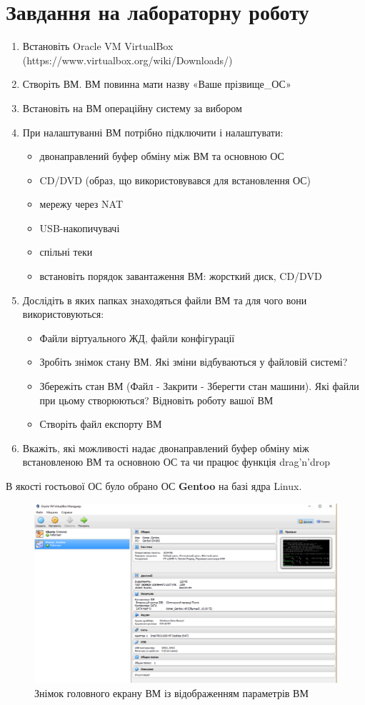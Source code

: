 \documentclass[12pt,a4paper]{article}
\begin{document}
\section{Завдання на лабораторну роботу}
\begin{enumerate}
	\item Встановіть Oracle VM VirtualBox (https://www.virtualbox.org/wiki/Downloads/)
	\item Створіть ВМ. ВМ повинна мати назву «Ваше прізвище\_ОС»
	\item Встановіть на ВМ операційну систему за вибором
	\item При налаштуванні ВМ потрібно підключити і налаштувати:
		\begin{itemize}
			\item двонаправлений буфер обміну між ВМ та основною ОС
			\item CD/DVD (образ, що використовувався для встановлення ОС)
			\item мережу через NAT
			\item USB-накопичувачі
			\item спільні теки
			\item встановіть порядок завантаження ВМ: жорсткий диск, CD/DVD
		\end{itemize}
	\item Дослідіть в яких папках знаходяться файли ВМ та для чого вони використовуються:
		\begin{itemize}
			\item Файли віртуального ЖД, файли конфігурації
			\item Зробіть знімок стану ВМ. Які зміни відбуваються у файловій системі?
			\item Збережіть стан ВМ (Файл - Закрити - Зберегти стан машини). Які файли при цьому створюються? Відновіть роботу вашої ВМ
			\item Створіть файл експорту ВМ
		\end{itemize}
	\item Вкажіть, які можливості надає двонаправлений буфер обміну між встановленою ВМ та
		основною ОС та чи працює функція drag'n'drop
\end{enumerate}

В якості гостьової ОС було обрано ОС \textbf{Gentoo} на базі ядра Linux.
\begin{figure}[ht]
	\includegraphics[width=\textwidth]{q3screen.png}
	\caption{Знімок головного екрану ВМ із відображенням параметрів ВМ}
\end{figure}
\end{document}
